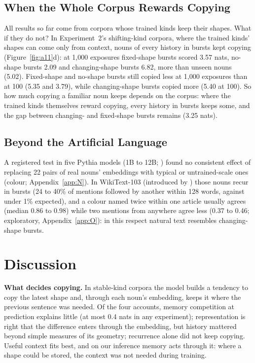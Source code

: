 \documentclass{article}
\begin{document}
\subsection{When the Whole Corpus Rewards Copying}\label{sec:beyond}
All results so far come from corpora whose trained kinds keep their shapes. What if they do not? In Experiment~2's shifting-kind corpora, where the trained kinds' shapes can come only from context, nouns of every history in bursts kept copying (Figure~\ref{fig:a11}d): at 1,000 exposures fixed-shape bursts scored 3.57 nats, no-shape bursts 2.09 and changing-shape bursts 6.82, more than unseen nouns (5.02). Fixed-shape and no-shape bursts still copied less at 1,000 exposures than at 100 (5.35 and 3.79), while changing-shape bursts copied more (5.40 at 100). So how much copying a familiar noun keeps depends on the corpus: where the trained kinds themselves reward copying, every history in bursts keeps some, and the gap between changing- and fixed-shape bursts remains (3.25 nats).


\subsection{Beyond the Artificial Language}\label{sec:pythia}
A registered test in five Pythia models (1B to 12B; \citealp{biderman2023}) found no consistent effect of replacing 22 pairs of real nouns' embeddings with typical or untrained-scale ones (colour; Appendix~\ref{app:N}). In WikiText-103 (introduced by \citealp{merity2017}) those nouns recur in bursts (24 to 40\% of mentions followed by another within 128 words, against under 1\% expected), and a colour named twice within one article usually agrees (median 0.86 to 0.98) while two mentions from anywhere agree less (0.37 to 0.46; exploratory, Appendix~\ref{app:O}): in this respect natural text resembles changing-shape bursts.


\section{Discussion}\label{sec:discussion}
\textbf{What decides copying.} In stable-kind corpora the model builds a tendency to copy the latest shape and, through each noun's embedding, keeps it where the previous sentence was needed. Of the four accounts, memory competition at prediction explains little (at most 0.4 nats in any experiment); representation is right that the difference enters through the embedding, but history mattered beyond simple measures of its geometry; recurrence alone did not keep copying. Useful context fits best, and on our inference memory acts through it: where a shape could be stored, the context was not needed during training.
\end{document}
